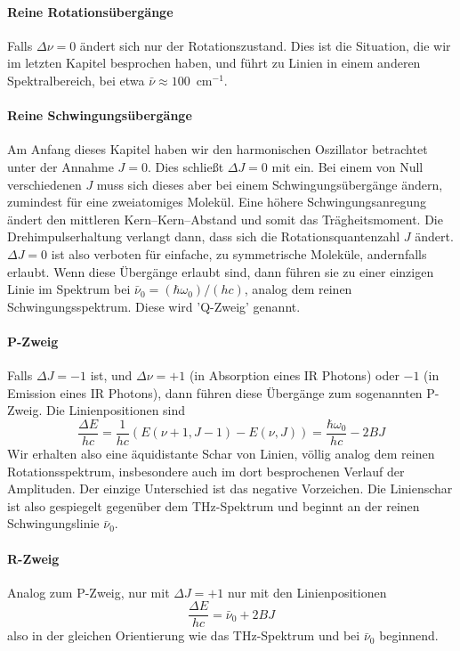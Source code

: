 \paragraph{Reine Rotationsübergänge} Falls $\Delta \nu = 0$ ändert sich nur der Rotationszustand. Dies ist die Situation, die wir im letzten Kapitel besprochen haben, und führt zu Linien  in einem anderen Spektralbereich, bei etwa $\bar{\nu} \approx 100$~cm$^{-1}$.

\paragraph{Reine Schwingungsübergänge} Am Anfang dieses Kapitel haben wir den  harmonischen Oszillator betrachtet unter der Annahme $J=0$. Dies schließt $\Delta J = 0$ mit ein. Bei einem von Null verschiedenen $J$ muss sich dieses aber bei einem Schwingungsübergänge ändern, zumindest für eine zweiatomiges Molekül. Eine höhere Schwingungsanregung ändert den mittleren Kern--Kern--Abstand und somit das Trägheitsmoment. Die Drehimpulserhaltung verlangt dann, dass sich die Rotationsquantenzahl $J$ ändert. $\Delta J = 0$ ist also verboten für einfache, zu symmetrische Moleküle, andernfalls erlaubt. Wenn diese Übergänge erlaubt sind, dann führen sie zu einer einzigen Linie im Spektrum bei $ \bar{\nu}_0 = (\hbar \omega_0)/(h c) $, analog dem reinen Schwingungsspektrum. Diese wird 'Q-Zweig' genannt. 

\paragraph{P-Zweig} Falls $\Delta J = -1$ ist, und $\Delta \nu = +1$ (in Absorption eines IR Photons) oder $-1$ (in Emission eines IR Photons), dann führen diese Übergänge zum sogenannten P-Zweig. Die Linienpositionen sind
\begin{equation}
 \frac{\Delta E}{h c} = \frac{1}{h c} \left( E(\nu +1, J -1) - E(\nu, J) \right) = \frac{\hbar \omega_0}{h c}   - 2 B J
\end{equation}
Wir erhalten also eine äquidistante Schar von Linien, völlig analog dem reinen Rotationsspektrum, insbesondere auch im dort besprochenen Verlauf der Amplituden. Der einzige Unterschied ist das negative Vorzeichen. Die Linienschar ist also gespiegelt gegenüber dem THz-Spektrum und beginnt an der reinen Schwingungslinie $\bar{\nu}_0 $.

\paragraph{R-Zweig} Analog zum P-Zweig, nur mit  $\Delta J = +1$ nur mit den Linienpositionen
\begin{equation}
 \frac{\Delta E}{h c} =  \bar{\nu}_0   + 2 B J
\end{equation}
also in der gleichen Orientierung wie das THz-Spektrum und bei $\bar{\nu}_0 $ beginnend.

